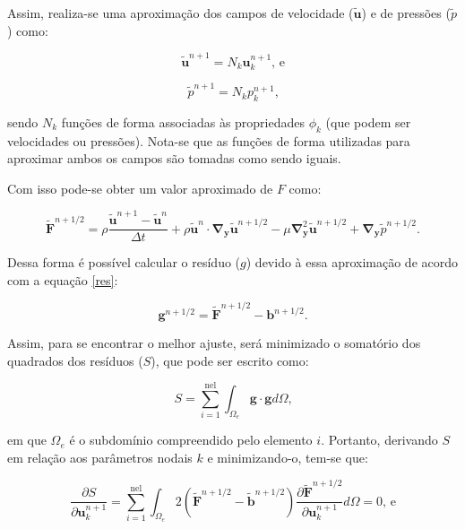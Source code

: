 \documentclass[_ArquivoPrincipal.tex]{subfiles}
\begin{document}
Assim, realiza-se uma aproximação dos campos de velocidade ($\tilde{\mathbf{u}}$) e de pressões ($\tilde{p}$) como:

\begin{equation}
    \tilde{\mathbf{u}}^{n+1}=N_k\mathbf{u}_k^{n+1}\text{, e}
    \label{uApprox}
\end{equation}

\begin{equation}
    \tilde{p}^{n+1}=N_kp_k^{n+1}\text{,}
    \label{pApprox}
\end{equation}

sendo $N_k$ funções de forma associadas às propriedades $\phi_k$ (que podem ser velocidades ou pressões). Nota-se que as funções de forma utilizadas para aproximar ambos os campos são tomadas como sendo iguais.

Com isso pode-se obter um valor aproximado de $F$ como:

\begin{equation}
    \tilde{\mathbf{F}}^{n+1/2}=\rho\frac{\tilde{\mathbf{u}}^{n+1}-\tilde{\mathbf{u}}^n}{\Delta t}+\rho\tilde{\mathbf{u}}^n\cdot\mathbf{\nabla}_\mathbf{y}\tilde{\mathbf{u}}^{n+1/2}-\mu\mathbf{\nabla}_\mathbf{y}^2\tilde{\mathbf{u}}^{n+1/2}+\mathbf{\nabla}_\mathbf{y}\tilde{p}^{n+1/2}\text{.}
    \label{FApproxTimeApprox}
\end{equation}

Dessa forma é possível calcular o resíduo ($g$) devido à essa aproximação de acordo com a equação \ref{res}:

\begin{equation}
    \mathbf{g}^{n+1/2}=\tilde{\mathbf{F}}^{n+1/2}-\mathbf{b}^{n+1/2}\text{.}
    \label{res}
\end{equation}

\noindent Assim, para se encontrar o melhor ajuste, será minimizado o somatório dos quadrados dos resíduos ($S$), que pode ser escrito como:

\begin{equation}
    S=\sum_{i=1}^{\mathrm{nel}}{\int_{\Omega_e}{\mathbf{g}\cdot\mathbf{g}}d\Omega}\text{,}
    \label{SQR}
\end{equation}

\noindent em que $\Omega_e$ é o subdomínio compreendido pelo elemento $i$. Portanto, derivando $S$ em relação aos parâmetros nodais $k$ e minimizando-o, tem-se que:

\begin{equation}
    \frac{\partial S}{\partial\mathbf{u}_k^{n+1}}=\sum_{i=1}^{\mathrm{nel}}{\int_{\Omega_e}{2\left(\tilde{\mathbf{F}}^{n+1/2}-\tilde{\mathbf{b}}^{n+1/2}\right)\frac{\partial\tilde{\mathbf{F}}^{n+1/2}}{\partial\mathbf{u}^{n+1}_k}d\Omega}}=0\text{, e}
    \label{dSdu}
\end{equation}
\end{document}
